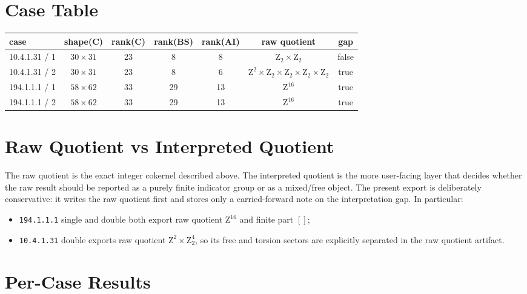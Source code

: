 \documentclass[11pt]{article}
\begin{document}
        \section{Case Table}
        \begin{center}
        \begin{tabular}{lcccccc}
        \toprule
        case & shape(C) & rank(C) & rank(BS) & rank(AI) & raw quotient & gap \\
        \midrule
        10.4.1.31 / 1 & $30 \times 31$ & 23 & 8 & 8 & $\mathrm{Z}_{2} \times \mathrm{Z}_{2}$ & false \\
10.4.1.31 / 2 & $30 \times 31$ & 23 & 8 & 6 & $\mathrm{Z}^{2} \times \mathrm{Z}_{2} \times \mathrm{Z}_{2} \times \mathrm{Z}_{2} \times \mathrm{Z}_{2}$ & true \\
194.1.1.1 / 1 & $58 \times 62$ & 33 & 29 & 13 & $\mathrm{Z}^{16}$ & true \\
194.1.1.1 / 2 & $58 \times 62$ & 33 & 29 & 13 & $\mathrm{Z}^{16}$ & true \\
        \bottomrule
        \end{tabular}
        \end{center}

        \section{Raw Quotient vs Interpreted Quotient}
        The raw quotient is the exact integer cokernel described above.
        The interpreted quotient is the more user-facing layer that decides whether the raw result should be reported as a purely finite indicator group or as a mixed/free object.
        The present export is deliberately conservative:
        it writes the raw quotient first and stores only a carried-forward note on the interpretation gap.
        In particular:
        \begin{itemize}
        \item \texttt{194.1.1.1} single and double both export raw quotient $\mathrm{Z}^{16}$ and finite part $[]$;
        \item \texttt{10.4.1.31} double exports raw quotient $\mathrm{Z}^2 \times \mathrm{Z}_2^4$, so its free and torsion sectors are explicitly separated in the raw quotient artifact.
        \end{itemize}

        \section{Per-Case Results}
\end{document}
